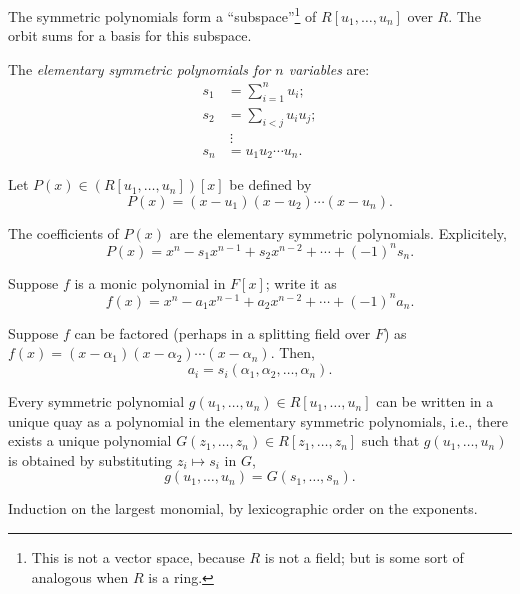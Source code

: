 \begin{prop}
	The symmetric polynomials form a ``subspace''\footnote{This is not a vector space, because $R$ is not a field; but is some sort of analogous when $R$ is a ring.} of $R[u_1, \dots, u_n]$ over $R$. The orbit sums for a basis for this subspace.
\end{prop}

\begin{defn}
	The \emph{elementary symmetric polynomials for $n$ variables} are:
	\begin{align*}
		s_1 &= \sum^{n}_{i=1} u_i;\\
		s_2 &= \sum_{i < j} u_iu_j;\\
		&\ \vdots\\
		s_n &= u_1 u_2 \cdots u_n.
	\end{align*}
\end{defn}

Let $P(x) \in \left( R[u_1, \dots, u_n] \right)[x] $ be defined by \[
	P(x) = (x-u_1)(x-u_2)\cdots(x-u_n).
\]

The coefficients of $P(x)$ are the elementary symmetric polynomials. Explicitely, \[
	P(x) = x^n - s_1x^{n-1} + s_2x^{n-2} + \cdots + (-1)^n s_n.
\]

\begin{lem}\label{l37:lem7}
Suppose $f$ is a monic polynomial in $F[x]$; write it as  \[
	f(x) = x^n - a_1 x^{n-1} + a_2 x^{n-2} + \cdots + (-1)^n a_n.
\]

Suppose $f$ can be factored (perhaps in a splitting field over $F$) as $f(x) = (x - \alpha_1)(x - \alpha_2)\cdots(x - \alpha_n)$. Then, \[
	a_i = s_i(\alpha_1, \alpha_2, \dots, \alpha_n).
\]
\end{lem}

\begin{thm}
	Every symmetric polynomial $g(u_1, \dots, u_n) \in R[u_1, \dots, u_n]$ can be written in a unique quay as a polynomial in the elementary symmetric polynomials, i.e., there exists a unique polynomial $G(z_1, \dots, z_n) \in R[z_1, \dots, z_n]$ such that $g(u_1, \dots, u_n)$ is obtained by substituting $z_i \mapsto s_i$ in $G$,  \[
		g(u_1, \dots, u_n) = G(s_1, \dots, s_n).
	\]
\end{thm}

\begin{sk}
	Induction on the largest monomial, by lexicographic order on the exponents.
\end{sk}

